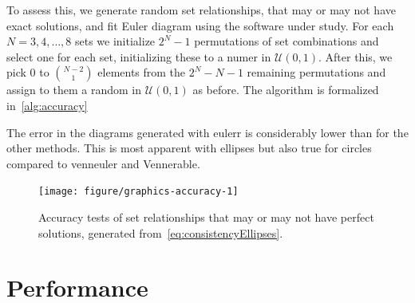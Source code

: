 \documentclass[
  oneside,
  usegeometry,
  numbers=noendperiod,
  openany,
  parskip=half
]{scrbook}\usepackage[]{graphicx}\usepackage{xcolor}
\newenvironment{knitrout}{}{} %
\newcommand{\pkg}[1]{{\fontseries{b}\selectfont #1}}
\begin{document}
To assess this, we generate random set relationships, that may or may not have exact solutions, and fit Euler diagram using the software under study. For each $N=3,4,\dots,8$ sets we initialize $2^N-1$ permutations of set combinations and select one for each set, initializing these to a numer in $\mathcal{U}(0, 1)$. After this, we pick 0 to $\binom{N-2}{1}$ elements from the $2^N-N-1$ remaining permutations and assign to them a random in $\mathcal{U}(0, 1)$ as before. The algorithm is formalized in~\cref{alg:accuracy}
%
%

The error in the diagrams generated with \pkg{eulerr} is considerably lower than for the other methods. This is most apparent with ellipses but also true for circles compared to \pkg{venneuler} and \pkg{Vennerable}.

\begin{figure}[hbt]
\begin{knitrout}
\color{fgcolor}

{\centering \texttt{[image: figure/graphics-accuracy-1]} 

}



\end{knitrout}
\caption{Accuracy tests of set relationships that may or may not have perfect solutions, generated from~\eqref{eq:consistencyEllipses}.}
\label{fig:accuracy}
\end{figure}

\section{Performance}
\label{sec:performance}
\end{document}

